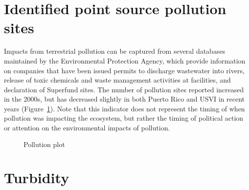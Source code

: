 \documentclass[
  letterpaper,
  oneside,
  open=any]{scrbook}
\begin{document}
\section{Identified point source pollution
sites}\label{identified-point-source-pollution-sites}

Impacts from terrestrial pollution can be captured from several
databases maintained by the Environmental Protection Agency, which
provide information on companies that have been issued permits to
discharge wastewater into rivers, release of toxic chemicals and waste
management activities at facilities, and declaration of Superfund sites.
The number of pollution sites reported increased in the 2000s, but has
decreased slightly in both Puerto Rico and USVI in recent years
(Figure~\ref{fig-pollution}). Note that this indicator does not
represent the timing of when pollution was impacting the ecosystem, but
rather the timing of political action or attention on the environmental
impacts of pollution.

\begin{figure}


\caption{\label{fig-pollution}Pollution plot}

\end{figure}%

\section{Turbidity}\label{turbidity}
\end{document}
